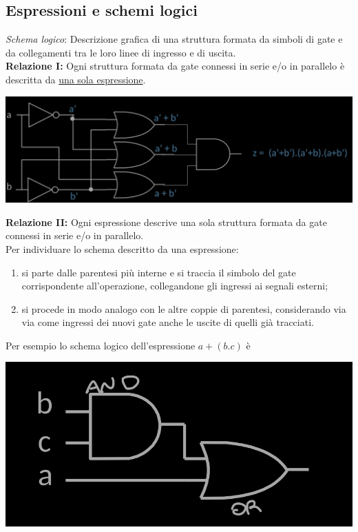 \documentclass{article}
\begin{document}
\subsection{Espressioni e schemi logici}
\textit{Schema logico}: Descrizione grafica di una struttura formata da simboli di gate e da collegamenti tra le loro linee di ingresso e di uscita.
\vspace{0.2cm}\\
\textbf{Relazione I:} Ogni struttura formata da gate connessi in serie e/o in parallelo è descritta da \underline{una sola espressione}.
\begin{center}
    \includegraphics[scale=0.42]{imesp.png}
\end{center}
\textbf{Relazione II:} Ogni espressione descrive una sola struttura formata da gate connessi in serie e/o in parallelo.
\vspace{0.2cm}\\
Per individuare lo schema descritto da una espressione:
\begin{enumerate}
    \item si parte dalle parentesi più interne e si traccia il simbolo del gate corrispondente all'operazione, collegandone gli ingressi ai segnali esterni;
    \item si procede in modo analogo con le altre coppie di parentesi, considerando via via come ingressi dei nuovi gate anche le uscite di quelli già tracciati.
\end{enumerate}
Per esempio lo schema logico dell'espressione $a+(b.c)$ è
\begin{center}
    \includegraphics[scale=0.35]{esp1}
\end{center}
\end{document}
